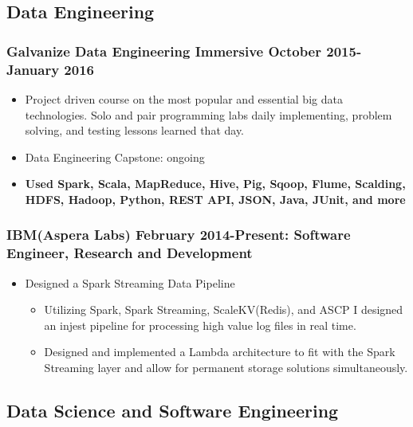 \documentclass[a4paper,10pt,notitlepage]{article}
\begin{document}
\subsection*{Data Engineering}
\subsubsection*{Galvanize Data Engineering Immersive October 2015-January 2016}
	\begin{itemize}
		\vspace{-5pt} \item Project driven course on the most popular and essential big data technologies. Solo and pair programming labs daily implementing, problem solving, and testing lessons learned that day.
		\vspace{-5pt} \item Data Engineering Capstone: ongoing
		\vspace{-5pt}\item 	\textbf{Used Spark, Scala, MapReduce, Hive, Pig, Sqoop, Flume, Scalding, HDFS, Hadoop, Python, REST API, JSON, Java, JUnit, and more}
	\end{itemize}
	\subsubsection*{IBM(Aspera Labs) February 2014-Present: Software Engineer, Research and Development}
	\begin{itemize}
	\vspace{-5pt}\item 	Designed a Spark Streaming Data Pipeline \begin{itemize}
					\item 	Utilizing Spark, Spark Streaming, ScaleKV(Redis), and ASCP I designed an injest pipeline for processing high value log files in real time.
					\item 	Designed and implemented a Lambda architecture to fit with the Spark Streaming layer and allow for permanent storage solutions simultaneously.
					\end{itemize}
	\end{itemize}
\subsection*{Data Science and Software Engineering}
\end{document}
